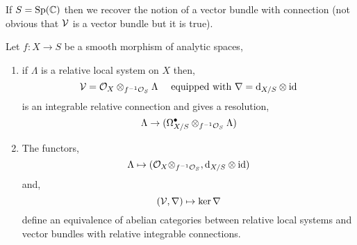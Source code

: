 \documentclass[12pt]{article}
\begin{document}
\begin{rmk}
If $S = \mathrm{Sp}(\mathbb{C})$ then we recover the notion of a vector bundle with connection (not obvious that $\mathcal{V}$ is a vector bundle but it is true).
\end{rmk}

\begin{thm}[relative RH]
Let $f : X \to S$ be a smooth morphism of analytic spaces,
\begin{enumerate}
\item if $\Lambda$ is a relative local system on $X$ then,
\[ \mathcal{V} = \mathcal{O}_{X} \otimes_{f^{-1} \mathcal{O}_{S}} \Lambda \quad \text{ equipped with } \nabla = \mathrm{d}_{X/S} \otimes \mathrm{id} \]
is an integrable relative connection and gives a resolution,
\[ \Lambda \to (\Omega_{X/S}^\bullet \otimes_{f^{-1} \mathcal{O}_{S}} \Lambda) \]

\item The functors,
\[ \Lambda \mapsto  (\mathcal{O}_{X} \otimes_{f^{-1} \mathcal{O}_{S}}, \mathrm{d}_{X/S} \otimes \mathrm{id}) \]
and,
\[ (\mathcal{V}, \nabla) \mapsto \ker{\nabla} \]
define an equivalence of abelian categories between relative local systems and vector bundles with relative integrable connections.
\end{enumerate}
\end{thm}
\end{document}
